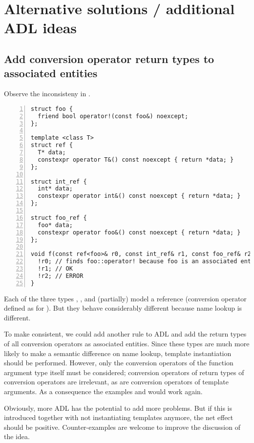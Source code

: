 \section{Alternative solutions / additional ADL ideas}

\subsection{Add conversion operator return types to associated entities}
\label{sec:convopadl}
Observe the inconsisteny in .
\begin{lstlisting}[style=Vc,numbers=left,float,label=lst:motivateADLconvop,caption={
Different name lookup for three reference types that should be equivalent 
(\url{https://godbolt.org/z/83fqT76vn})
}]
struct foo {
  friend bool operator!(const foo&) noexcept;
};

template <class T>
struct ref {
  T* data;
  constexpr operator T&() const noexcept { return *data; }
};

struct int_ref {
  int* data;
  constexpr operator int&() const noexcept { return *data; }
};

struct foo_ref {
  foo* data;
  constexpr operator foo&() const noexcept { return *data; }
};

void f(const ref<foo>& r0, const int_ref& r1, const foo_ref& r2) {
  !r0; // finds foo::operator! because foo is an associated entity
  !r1; // OK
  !r2; // ERROR
}
\end{lstlisting}
Each of the three types , , and  (partially) 
model a reference (conversion operator defined as for ). 
But they behave considerably different because name lookup is different.

To make  consistent, we could add another rule to ADL and add the 
return types of all conversion operators as associated entities. Since these types are 
much more likely to make a semantic difference on name lookup, template instantiation 
should be performed. However, only the conversion operators of the function argument type 
itself must be considered; conversion operators of return types of conversion operators 
are irrelevant, as are conversion operators of template arguments. As a consequence the 
examples  and  would work again.

Obviously, more ADL has the potential to add more problems. But if this is introduced 
together with not instantiating templates anymore, the net effect should be positive. 
Counter-examples are welcome to improve the discussion of the idea.


